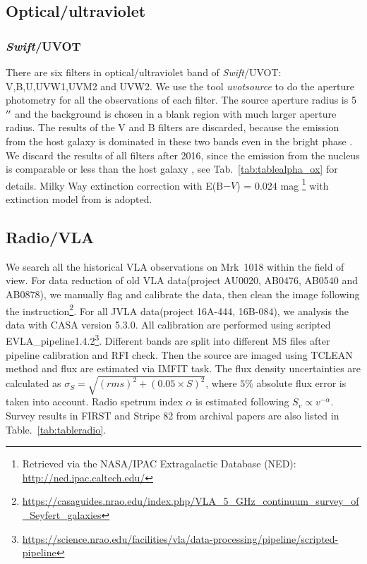\documentclass{aastex63}
\newcommand{\swift}{{\em Swift}}
\begin{document}
\subsection{Optical/ultraviolet}
\subsubsection{\swift/UVOT}
There are six filters in optical/ultraviolet band of \swift/UVOT: V,B,U,UVW1,UVM2 and UVW2. We use the tool \textit{uvotsource} to do the aperture photometry for all the observations of each filter. The source aperture radius is 5$\mbox{$^{\prime\prime}$}$ and the background is chosen in a blank region with much larger aperture radius. The results of the V and B filters are discarded, because the emission from the host galaxy is dominated in these two bands even in the bright phase \citep{2018MNRAS.480.3898N}. We discard the results of all filters after 2016, since the emission from the nucleus is comparable or less than the host galaxy \citep{2018MNRAS.480.3898N}, see Tab.~\ref{tab:tablealpha_ox} for details. Milky Way extinction correction with \texorpdfstring{E(B$-V$) = 0.024}. mag \footnote{Retrieved via the NASA/IPAC Extragalactic Database (NED): \url{http://ned.ipac.caltech.edu/}} with extinction model from \citet{2007ApJ...663..320F} is adopted.  


\subsection{Radio/VLA}
We search all the historical VLA observations on Mrk~1018 within the field of view. For data reduction of old VLA data(project AU0020, AB0476, AB0540 and AB0878), we manually flag and calibrate the data, then clean the image following the instruction\footnote{\url{https://casaguides.nrao.edu/index.php/VLA_5_GHz_continuum_survey_of_Seyfert_galaxies}}. For all JVLA data(project 16A-444, 16B-084),  we analysis the data with CASA version 5.3.0\citep{2007ASPC..376..127M}. All calibration are performed using scripted EVLA\_pipeline1.4.2\footnote{\url{https://science.nrao.edu/facilities/vla/data-processing/pipeline/scripted-pipeline}}. Different bands are split into different MS files after pipeline calibration and RFI check. Then the source are imaged using TCLEAN method and flux are estimated via IMFIT task. The flux density uncertainties are calculated as $\sigma_{S}=\sqrt{(rms)^2+(0.05\times S)^2}$, where $5\%$ absolute flux error is taken into account. Radio spetrum index $\alpha$ is estimated following $S_v \propto v^{-\alpha}$. Survey results in FIRST\citep{1994ASPC...61..165B,1995ApJ...450..559B} and Stripe 82\citep{2011AJ....142....3H} from archival papers are also listed in Table.~\ref{tab:tableradio}.
\end{document}
